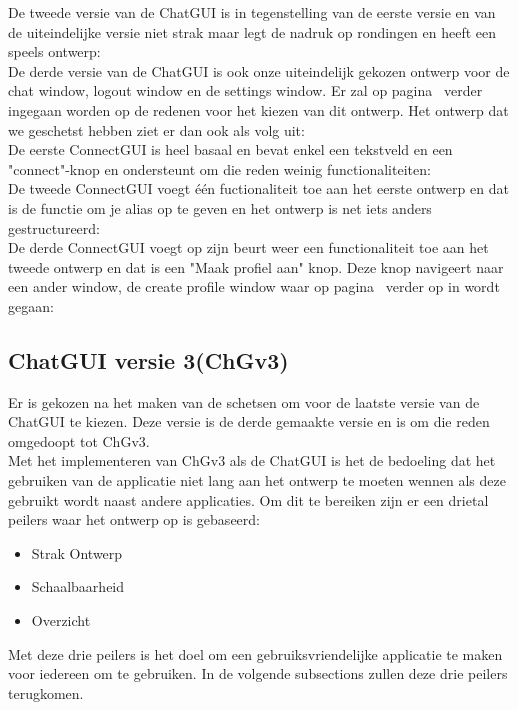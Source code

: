 \documentclass[12pt]{article}
\begin{document}
\noindent De tweede versie van de ChatGUI is in tegenstelling van de eerste versie en van de uiteindelijke versie niet strak maar legt de nadruk op rondingen en heeft een speels ontwerp:
\\

\noindent De derde versie van de ChatGUI is ook onze uiteindelijk gekozen ontwerp voor de chat window, logout window en de settings window. Er zal op pagina~\pageref{ChatGUI} verder ingegaan worden op de redenen voor het kiezen van dit ontwerp. Het ontwerp dat we geschetst hebben ziet er dan ook als volg uit:
\label{ChGv3Chat}
\\

\noindent De eerste ConnectGUI is heel basaal en bevat enkel een tekstveld en een "connect"-knop en ondersteunt om die reden weinig functionaliteiten:
\\

\noindent De tweede ConnectGUI voegt \'e\'en fuctionaliteit toe aan het eerste ontwerp en dat is de functie om je alias op te geven en het ontwerp is net iets anders gestructureerd:
\\

\noindent De derde ConnectGUI voegt op zijn beurt weer een functionaliteit toe aan het tweede ontwerp en dat is een "Maak profiel aan" knop. Deze knop navigeert naar een ander window, de create profile window waar op pagina~\pageref{CPW} verder op in wordt gegaan:

\subsection{ChatGUI versie 3(ChGv3)}
\label{ChatGUI}
Er is gekozen na het maken van de schetsen om voor de laatste versie van de ChatGUI te kiezen. Deze versie is de derde gemaakte versie en is om die reden omgedoopt tot ChGv3. \\

\noindent Met het implementeren van ChGv3 als de ChatGUI is het de bedoeling dat het gebruiken van de applicatie niet lang aan het ontwerp te moeten wennen als deze gebruikt wordt naast andere applicaties. Om dit te bereiken zijn er een drietal peilers waar het ontwerp op is gebaseerd:
\begin{itemize}
\item{Strak Ontwerp}
\item{Schaalbaarheid}
\item{Overzicht}
\end{itemize}
Met deze drie peilers is het doel om een gebruiksvriendelijke applicatie te maken voor iedereen om te gebruiken. In de volgende subsections zullen deze drie peilers terugkomen.
\end{document}
